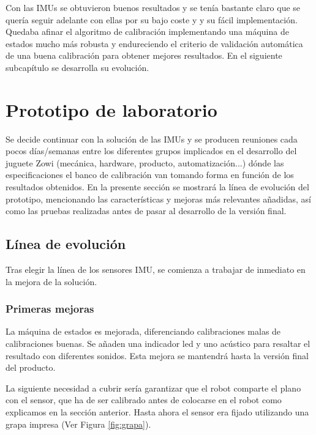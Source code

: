 Con las IMUs se obtuvieron buenos resultados y se tenía bastante claro que se quería seguir adelante con ellas por su bajo coste y y su fácil implementación. Quedaba afinar el algoritmo de calibración implementando una máquina de estados mucho más robusta y endureciendo el criterio de validación automática de una buena calibración para obtener mejores resultados. En el siguiente subcapítulo se desarrolla su evolución.


\section{Prototipo de laboratorio}

Se decide continuar con la solución de las IMUs y se producen reuniones cada pocos días/semanas entre los diferentes grupos implicados en el desarrollo del juguete Zowi (mecánica, hardware, producto, automatización...) dónde las especificaciones el banco de calibración van tomando forma en función de los resultados obtenidos. En la presente sección se mostrará la línea de evolución del prototipo, mencionando las características y mejoras más relevantes añadidas, así como las pruebas realizadas antes de pasar al desarrollo de la versión final.

\subsection{Línea de evolución}

Tras elegir la línea de los sensores IMU, se comienza a trabajar de inmediato en la mejora de la solución.

\subsubsection{Primeras mejoras}

La máquina de estados es mejorada, diferenciando calibraciones malas de calibraciones buenas. Se añaden una indicador led y uno acústico para resaltar el resultado con diferentes sonidos. Esta mejora se mantendrá hasta la versión final del producto.

La siguiente necesidad a cubrir sería garantizar que el robot comparte el plano con el sensor, que ha de ser calibrado antes de colocarse en el robot como explicamos en la sección anterior. Hasta ahora el sensor era fijado utilizando una grapa impresa (Ver Figura \ref{fig:grapa}).

